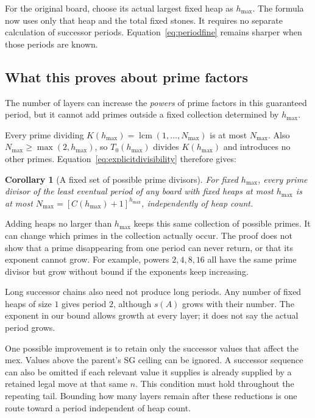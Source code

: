 \documentclass[11pt]{article}
\newtheorem{corollary}[theorem]{Corollary}
\begin{document}
For the original board, choose its actual largest fixed heap as
$h_{\max}$. The formula now uses only that heap and the total
fixed stones. It requires no separate calculation of successor
periods. Equation~\eqref{eq:periodfine} remains sharper when
those periods are known.

\subsection{What this proves about prime factors}

The number of layers can increase the \emph{powers} of prime
factors in this guaranteed period, but it cannot add primes
outside a fixed collection determined by $h_{\max}$.

Every prime dividing $K(h_{\max})=\operatorname{lcm}(1,\ldots,N_{\max})$
is at most $N_{\max}$. Also $N_{\max}\ge\max(2,h_{\max})$,
so $T_0(h_{\max})$ divides $K(h_{\max})$ and introduces no
other primes. Equation~\eqref{eq:explicitdivisibility} therefore gives:

\begin{corollary}[A fixed set of possible prime divisors]
\label{cor:primepool}
For fixed $h_{\max}$, every prime divisor of the least eventual
period of any board with fixed heaps at most $h_{\max}$ is at most
$N_{\max}=[C(h_{\max})+1]^{h_{\max}}$, independently of heap count.
\end{corollary}

Adding heaps no larger than $h_{\max}$ keeps this same collection
of possible primes. It can change which primes in the collection
actually occur. The proof does not show that a prime disappearing
from one period can never return, or that its exponent cannot grow.
For example, powers $2,4,8,16$ all have the same prime divisor
but grow without bound if the exponents keep increasing.

Long successor chains also need not produce long periods.
Any number of fixed heaps of size $1$ gives period $2$, although
$s(A)$ grows with their number. The exponent in our bound allows
growth at every layer; it does not say the actual period grows.

One possible improvement is to retain only the successor values
that affect the mex. Values above the parent's SG ceiling can be
ignored. A successor sequence can also be omitted if each relevant
value it supplies is already supplied by a retained legal move at
that same $n$. This condition must hold throughout the repeating
tail. Bounding how many layers remain after these reductions is
one route toward a period independent of heap count.
\end{document}
